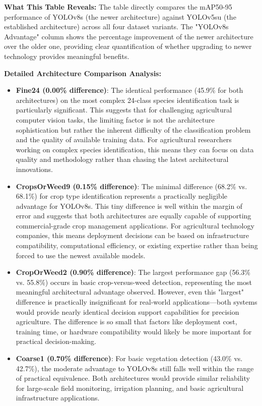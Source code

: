 \textbf{What This Table Reveals:} The table directly compares the mAP50-95 performance of YOLOv8s (the newer architecture) against YOLOv5su (the established architecture) across all four dataset variants. The "YOLOv8s Advantage" column shows the percentage improvement of the newer architecture over the older one, providing clear quantification of whether upgrading to newer technology provides meaningful benefits.

\textbf{Detailed Architecture Comparison Analysis:}

\begin{itemize}
    \item \textbf{Fine24 (0.00\% difference)}: The identical performance (45.9\% for both architectures) on the most complex 24-class species identification task is particularly significant. This suggests that for challenging agricultural computer vision tasks, the limiting factor is not the architecture sophistication but rather the inherent difficulty of the classification problem and the quality of available training data. For agricultural researchers working on complex species identification, this means they can focus on data quality and methodology rather than chasing the latest architectural innovations.
    
    \item \textbf{CropsOrWeed9 (0.15\% difference)}: The minimal difference (68.2\% vs. 68.1\%) for crop type identification represents a practically negligible advantage for YOLOv8s. This tiny difference is well within the margin of error and suggests that both architectures are equally capable of supporting commercial-grade crop management applications. For agricultural technology companies, this means deployment decisions can be based on infrastructure compatibility, computational efficiency, or existing expertise rather than being forced to use the newest available models.
    
    \item \textbf{CropOrWeed2 (0.90\% difference)}: The largest performance gap (56.3\% vs. 55.8\%) occurs in basic crop-versus-weed detection, representing the most meaningful architectural advantage observed. However, even this "largest" difference is practically insignificant for real-world applications—both systems would provide nearly identical decision support capabilities for precision agriculture. The difference is so small that factors like deployment cost, training time, or hardware compatibility would likely be more important for practical decision-making.
    
    \item \textbf{Coarse1 (0.70\% difference)}: For basic vegetation detection (43.0\% vs. 42.7\%), the moderate advantage to YOLOv8s still falls well within the range of practical equivalence. Both architectures would provide similar reliability for large-scale field monitoring, irrigation planning, and basic agricultural infrastructure applications.
\end{itemize}

